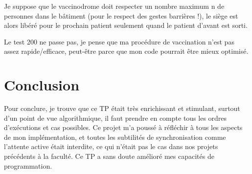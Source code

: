 \documentclass[a4paper]{article}
\makeatletter
\newenvironment{expl}{%
  \begin{list}{}{%
      \small\itshape%
      \topsep\z@%
      \listparindent0pt%
      \parsep0.75\baselineskip%
      \setlength{\leftmargin}{20mm}%
      \setlength{\rightmargin}{20mm}%
    }
  \item[]}%
  {\end{list}}
\makeatother
\begin{document}
\begin{expl}
  Je suppose que le vaccinodrome doit respecter un nombre maximum n de personnes dans le bâtiment (pour le respect des gestes barrières !), le siège est alors libéré pour le prochain patient seulement quand le patient d'avant est sorti.
  
  
  
  Le test 200 ne passe pas, je pense que ma procédure de vaccination n'est pas assez rapide/efficace, peut-être
  parce que mon code pourrait être mieux optimisé. 
\end{expl}

\section{Conclusion}

\begin{expl}
  Pour conclure, je trouve que ce TP était très enrichissant et stimulant,
   surtout d'un point de vue algorithmique, il faut prendre en compte tous les ordres 
   d'exécutions et cas possibles. 
  Ce projet m'a poussé à réfléchir à tous les aspects de mon implémentation, et toutes les
   subtilités de synchronisation comme l'attente active était interdite, ce qui n'était pas le
    cas dans nos projets précédents à la faculté. Ce TP a sans doute amélioré mes capacités de programmation.
\end{expl}
\end{document}
